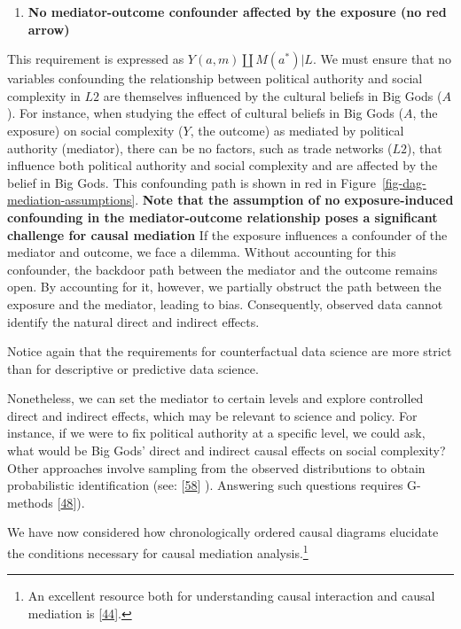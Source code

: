 \documentclass[
  singlecolumn]{article}
\providecommand{\tightlist}{%
  \setlength{\itemsep}{0pt}\setlength{\parskip}{0pt}}\usepackage{longtable,booktabs,array}
\begin{document}
\begin{enumerate}
\def\labelenumi{\arabic{enumi}.}
\setcounter{enumi}{3}
\tightlist
\item
  \textbf{No mediator-outcome confounder affected by the exposure (no
  red arrow)}
\end{enumerate}

This requirement is expressed as \(Y(a,m) \coprod M(a^*) | L\). We must
ensure that no variables confounding the relationship between political
authority and social complexity in \(L2\) are themselves influenced by
the cultural beliefs in Big Gods (\(A\)). For instance, when studying
the effect of cultural beliefs in Big Gods (\(A\), the exposure) on
social complexity (\(Y\), the outcome) as mediated by political
authority (mediator), there can be no factors, such as trade networks
(\(L2\)), that influence both political authority and social complexity
and are affected by the belief in Big Gods. This confounding path is
shown in red in Figure~\ref{fig-dag-mediation-assumptions}. \textbf{Note
that the assumption of no exposure-induced confounding in the
mediator-outcome relationship poses a significant challenge for causal
mediation} If the exposure influences a confounder of the mediator and
outcome, we face a dilemma. Without accounting for this confounder, the
backdoor path between the mediator and the outcome remains open. By
accounting for it, however, we partially obstruct the path between the
exposure and the mediator, leading to bias. Consequently, observed data
cannot identify the natural direct and indirect effects.

Notice again that the requirements for counterfactual data science are
more strict than for descriptive or predictive data science.

Nonetheless, we can set the mediator to certain levels and explore
controlled direct and indirect effects, which may be relevant to science
and policy. For instance, if we were to fix political authority at a
specific level, we could ask, what would be Big Gods' direct and
indirect causal effects on social complexity? Other approaches involve
sampling from the observed distributions to obtain probabilistic
identification (see: {[}\protect\hyperlink{ref-shi2021}{58}{]} ).
Answering such questions requires G-methods
{[}\protect\hyperlink{ref-hernuxe1n2023a}{48}{]}).

We have now considered how chronologically ordered causal diagrams
elucidate the conditions necessary for causal mediation
analysis.\footnote{An excellent resource both for understanding causal
  interaction and causal mediation is
  {[}\protect\hyperlink{ref-vanderweele2015}{44}{]}.}
\end{document}
